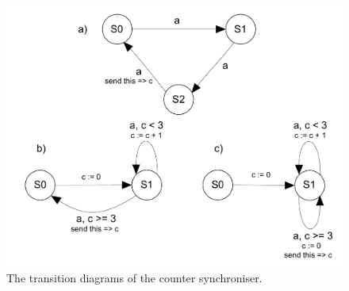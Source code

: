 \documentclass{article}
\begin{document}
\begin{enumerate}
  \begin{figure}[here]
  \centering
  \includegraphics[scale=0.4]{figs/counter.pdf}
  \caption{The transition diagrams of the counter synchroniser.}
  \label{fig:counter}
  \end{figure}

\end{enumerate}




\end{document}
